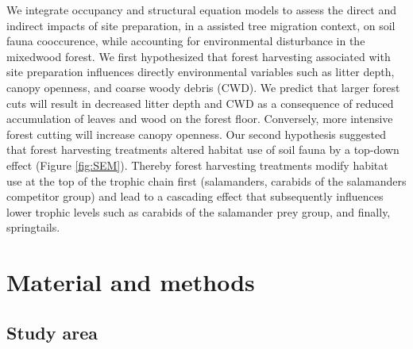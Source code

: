 We integrate occupancy and structural equation models to assess the direct and indirect impacts of site preparation, in a assisted tree migration context, 
on soil fauna cooccurence, while accounting for environmental disturbance in the mixedwood forest.
We first hypothesized that forest harvesting associated with site preparation influences directly environmental variables such as litter depth, canopy openness, and coarse woody debris (CWD). 
We predict that larger forest cuts will result in decreased litter depth and CWD as a consequence of reduced accumulation of leaves and wood on the forest floor.
Conversely, more intensive forest cutting will increase canopy openness. 
Our second hypothesis suggested that forest harvesting treatments altered habitat use of soil fauna by a top-down effect (Figure \ref*{fig:SEM}). 
Thereby forest harvesting treatments modify habitat use at the top of the trophic chain first (salamanders, carabids of the salamanders competitor group) and lead to 
a cascading effect that subsequently influences lower trophic levels such as carabids of the salamander prey group, and finally, springtails.


\section*{Material and methods}
\label{sec:matmet1}

\subsection*{Study area}
\label{subsec:area}

